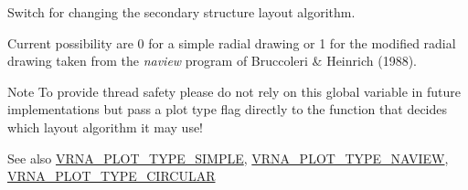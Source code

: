 Switch for changing the secondary structure layout algorithm. 

Current possibility are 0 for a simple radial drawing or 1 for the modified radial drawing taken from the {\itshape naview} program of Bruccoleri \& Heinrich (1988).

\begin{DoxyNote}{Note}
To provide thread safety please do not rely on this global variable in future implementations but pass a plot type flag directly to the function that decides which layout algorithm it may use!
\end{DoxyNote}
\begin{DoxySeeAlso}{See also}
\hyperlink{group__plotting__utils_gae6d17b9f0a53cf5205a9181e0f8422e9}{V\+R\+N\+A\+\_\+\+P\+L\+O\+T\+\_\+\+T\+Y\+P\+E\+\_\+\+S\+I\+M\+P\+L\+E}, \hyperlink{group__plotting__utils_ga94d4c863ecac2f220f76658afb92f964}{V\+R\+N\+A\+\_\+\+P\+L\+O\+T\+\_\+\+T\+Y\+P\+E\+\_\+\+N\+A\+V\+I\+E\+W}, \hyperlink{group__plotting__utils_ga8c9eac631348da92136c8363ecdd9fb9}{V\+R\+N\+A\+\_\+\+P\+L\+O\+T\+\_\+\+T\+Y\+P\+E\+\_\+\+C\+I\+R\+C\+U\+L\+A\+R} 
\end{DoxySeeAlso}

